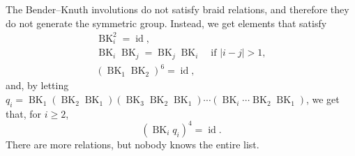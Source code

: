\begin{remark}
    The Bender--Knuth involutions do not satisfy braid relations,
    and therefore they do not generate the symmetric group.
    Instead, we get elements that satisfy
    \begin{gather}
        \operatorname{BK}_i^2 = \operatorname{id}, \\
        \operatorname{BK}_i \operatorname{BK}_j = \operatorname{BK}_j \operatorname{BK}_i \quad \text{if } |i - j| > 1, \\
        (\operatorname{BK}_1 \operatorname{BK}_2)^6 = \operatorname{id},
    \end{gather}
    and, by letting \(q_i =
    \operatorname{BK}_1
    (\operatorname{BK}_2 \operatorname{BK}_1)
    (\operatorname{BK}_3 \operatorname{BK}_2 \operatorname{BK}_1)
    \cdots
    (\operatorname{BK}_i \cdots \operatorname{BK}_2 \operatorname{BK}_1)\),
    we get that, for \(i \geq 2\),
    \begin{equation}
        (\operatorname{BK}_i q_i)^4 = \operatorname{id}.
    \end{equation}
    There are more relations, but nobody knows the entire list.
\end{remark}